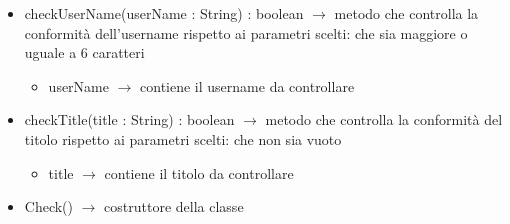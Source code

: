 \begin{description}
\begin{itemize}
	\item checkUserName(userName : String) : boolean $\rightarrow$ metodo che controlla la conformità dell'username rispetto ai parametri scelti: che sia maggiore o uguale a 6 caratteri\begin{itemize}
		\item userName $\rightarrow$ contiene il username da controllare 
	\end{itemize}
	
	\item checkTitle(title : String) : boolean $\rightarrow$ metodo che controlla la conformità del titolo rispetto ai parametri scelti: che non sia vuoto\begin{itemize}
		\item title $\rightarrow$ contiene il titolo da controllare 
	\end{itemize}
	
	\item Check() $\rightarrow$ costruttore della classe
\end{itemize}

\end{description}

\vspace{0.5cm}
\hypertarget{client::util::Util}{}
